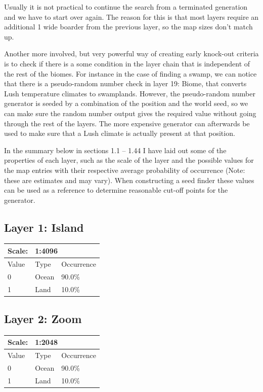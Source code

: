\documentclass{article}
\begin{document}
	Usually it is not practical to continue the search from a terminated generation and we have to start over again. The reason for this is that most layers require an additional 1 wide boarder from the previous layer, so the map sizes don't match up.

	Another more involved, but very powerful way of creating early knock-out criteria is to check if there is a some condition in the layer chain that is independent of the rest of the biomes. For instance in the case of finding a swamp, we can notice that there is a pseudo-random number check in layer 19: Biome, that converts Lush temperature climates to swamplands. However, the pseudo-random number generator is seeded by a combination of the position and the world seed, so we can make sure the random number output gives the required value without going through the rest of the layers. The more expensive generator can afterwards be used to make sure that a Lush climate is actually present at that position.


	In the summary below in sections 1.1 -- 1.44 I have laid out some of the properties of each layer, such as the scale of the layer and the possible values for the map entries with their respective average probability of occurrence (Note: these are estimates and may vary). When constructing a seed finder these values can be used as a reference to determine reasonable cut-off points for the generator.


	


	\subsection{Layer 1: Island}
	\begin{tabular}{|l|l|l|}\hline
		Scale: & \multicolumn{2}{|l|}{1:4096} \\\hline\hline
		Value  & Type   & Occurrence \\\hline
		0      & Ocean  & 90.0\%\\\hline
		1      & Land   & 10.0\%\\\hline
	\end{tabular}

	\subsection{Layer 2: Zoom}
	\begin{tabular}{|l|l|l|}\hline
		Scale: & \multicolumn{2}{|l|}{1:2048} \\\hline\hline
		Value  & Type   & Occurrence \\\hline
		0      & Ocean  & 90.0\%\\\hline
		1      & Land   & 10.0\%\\\hline
	\end{tabular}
\end{document}
